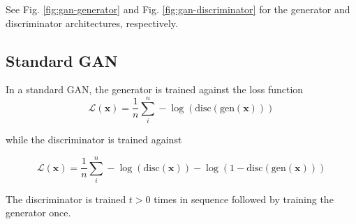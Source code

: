 \documentclass[twoside,11pt,a4paper]{article}
\begin{document}
See Fig. \ref{fig:gan-generator} and Fig. \ref{fig:gan-discriminator} for the generator and discriminator architectures, respectively.

\subsection{Standard GAN}

In a standard GAN, the generator is trained against the loss function
\begin{equation}
  \mathcal{L}(\textbf{x}) = \frac{1}{n}\sum_i^n - \log(\text{disc}(\text{gen}(\textbf{x})))
\end{equation}


while the discriminator is trained against

\begin{equation}
  \mathcal{L}(\textbf{x}) = \frac{1}{n}\sum_i^n - \log(\text{disc}(\textbf{x})) - \log(1 - \text{disc}(\text{gen}(\textbf{x})))
\end{equation}


The discriminator is trained $t > 0$ times in sequence followed by training the generator once.
\end{document}
